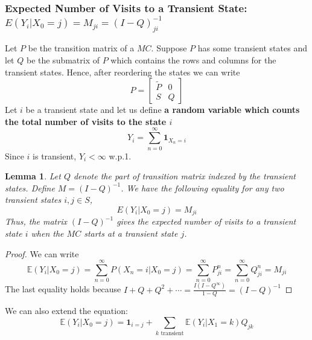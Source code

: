\documentclass[11pt,a4paper]{article}
\newtheorem{lemma}{Lemma}
\begin{document}
\subsubsection{Expected Number of Visits to a Transient State: $E(Y_i|X_0 = j) = M_{ji} = (I-Q)^{-1}_{ji}$}
Let $P$ be the transition matrix of a $MC$. Suppose $P$ has some transient states and let $Q$ be the submatrix of $P$ which contains the rows and columns for the transient states. Hence, after reordering the states we can write $$P=\begin{bmatrix}
    \tilde{P}&0\\
    S&Q
\end{bmatrix}$$
Let $i$ be a transient state and let us define \textbf{a random variable which counts the total number of visits to the state $i$}$$Y_i=\sum_{n=0}^\infty \mathbf{1}_{X_n=i}$$
Since $i$ is transient, $Y_i<\infty$ w.p.1.
\begin{lemma}
    Let $Q$ denote the part of transition matrix indexed by the transient states. Define $M = (I-Q)^{-1}$. We have the following equality for any two transient states $i,j\in S$,
    $$E(Y_i|X_0 = j) = M_{ji}$$ Thus, the matrix $(I-Q)^{-1}$ gives the expected number of visits to a transient state $i$ when the $MC$ starts at a transient state $j$.
\end{lemma}
\begin{proof}
    We can write $$\mathbb{E}(Y_i|X_0 = j)=\sum_{n=0}^\infty P(X_n=i|X_0=j)=\sum_{n=0}^\infty P^n_{ji}=\sum_{n=0}^\infty Q^n_{ji}=M_{ji}$$
    The last equality holds because $I+Q+Q^2+\cdots=\frac{I(I-Q^\infty)}{1-Q}=(I-Q)^{-1}$
\end{proof}

We can also extend the equation: $$\mathbb{E}(Y_i|X_0 = j)=\mathbf{1}_{i=j}+\sum_{k\text{ transient}}\mathbb{E}(Y_i|X_1=k)Q_{jk}$$
\end{document}
